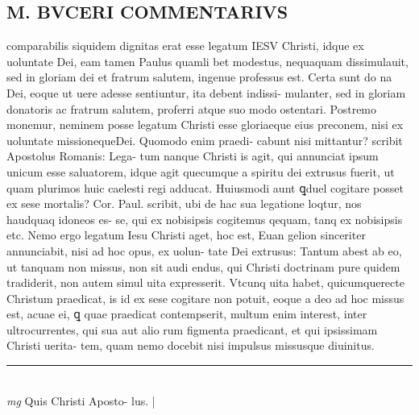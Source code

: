\documentclass{article}
\begin{document}
\begin{pages}
\section*{M. BVCERI COMMENTARIVS }
\marginpar{[ p.18 ]}\pstart comparabilis siquidem dignitas erat esse legatum IESV Christi, idque ex uoluntate Dei, eam tamen Paulus quamli bet modestus, nequaquam dissimulauit, sed in gloriam dei et fratrum salutem, ingenue professus est. Certa sunt do na Dei, eoque ut uere adesse sentiuntur, ita debent indissi- mulanter, sed in gloriam donatoris ac fratrum salutem, proferri atque suo modo ostentari.  Postremo monemur, neminem posse legatum Christi esse gloriaeque eius preconem, nisi ex uoluntate missionequeDei.  Quomodo enim praedi- cabunt nisi mittantur? scribit Apostolus Romanis: Lega- tum nanque Christi is agit, qui annunciat ipsum unicum esse saluatorem, idque agit quecumque a spiritu dei extrusus fuerit, ut quam plurimos huic caelesti regi adducat.  Huiusmodi aunt ꝗduel cogitare posset ex sese mortalis? Cor. Paul.  scribit, ubi de hac sua legatione loqtur, nos haudquaq idoneos es- se, qui ex nobisipsis cogitemus qequam, tanq ex nobisipsis etc.  Nemo ergo legatum Iesu Christi aget, hoc est, Euan gelion sinceriter annunciabit, nisi ad hoc opus, ex uolun- tate Dei extrusus:  \pend\pstart Tantum abest ab eo, ut tanquam non missus, non sit audi endus, qui Christi doctrinam pure quidem tradiderit, non autem simul uita expresserit. Vtcunq uita habet, quicumquerecte Christum praedicat, is id ex sese cogitare non potuit, eoque a deo ad hoc missus est, acuae ei, ꝗ quae praedicat contempserit, multum enim interest, inter ultrocurrentes, qui sua aut alio rum figmenta praedicant, et qui ipsissimam Christi uerita- tem, quam nemo docebit nisi impulsus missusque diuinitus.   \pend
\vspace{0.5cm}\noindent
\vspace{0.2cm}\rule{1cm}{0.2pt}\\ 
\hspace{0.2cm}\textit{mg}
\footnotesize Quis Christi Aposto- lus.  
\normalsize| 

\end{pages}
\end{document}
